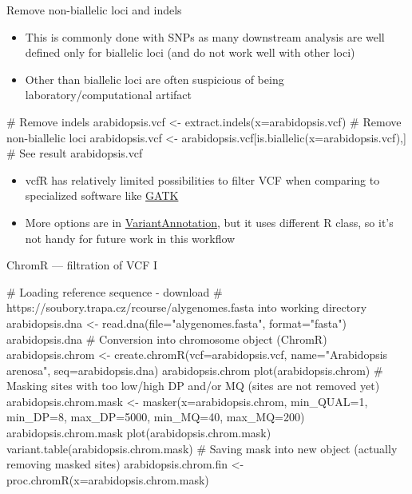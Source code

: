 \documentclass[compress, xelatex, 11pt, xcolor=svgnames, aspectratio=169,
	hyperref={
		bookmarks=true,
		unicode=true,
		colorlinks=true,
		pdftitle={Molecular data in R},
		plainpages=false,
		pdfauthor={Vojtech Zeisek},
		pdfsubject={Course about phylogeny and evolution in R},
		pdfcreator={XeLaTeX},
		pdfkeywords={R, evolution, phylogeny, molecular data},
		linkcolor=Crimson, %
		anchorcolor=Magenta, %
		citecolor=Magenta, %
		filecolor=Magenta, %
		menucolor=Magenta, %
		urlcolor=DodgerBlue, %
		},
	url={hyphens, lowtilde} %
	]{beamer}
\begin{document}
\begin{frame}[fragile]{Remove non-biallelic loci and indels}
	\begin{itemize}
		\item This is commonly done with SNPs as many downstream analysis are well defined only for biallelic loci (and do not work well with other loci)
		\item Other than biallelic loci are often suspicious of being laboratory/computational artifact
	\end{itemize}
	\begin{spluscode}
    # Remove indels
    arabidopsis.vcf <- extract.indels(x=arabidopsis.vcf)
    # Remove non-biallelic loci
    arabidopsis.vcf <- arabidopsis.vcf[is.biallelic(x=arabidopsis.vcf),]
    # See result
    arabidopsis.vcf
	\end{spluscode}
	\begin{itemize}
		\item vcfR has relatively limited possibilities to filter VCF when comparing to specialized software like \href{https://gatk.broadinstitute.org/}{GATK}
		\item More options are in \href{https://bioconductor.org/packages/release/bioc/html/VariantAnnotation.html}{VariantAnnotation}, but it uses different R class, so it's not handy for future work in this workflow
	\end{itemize}
\end{frame}

\begin{frame}[fragile]{ChromR --- filtration of VCF I}
	\begin{spluscode}
    # Loading reference sequence - download
    # https://soubory.trapa.cz/rcourse/alygenomes.fasta into working directory
    arabidopsis.dna <- read.dna(file="alygenomes.fasta", format="fasta")
    arabidopsis.dna
    # Conversion into chromosome object (ChromR)
    arabidopsis.chrom <- create.chromR(vcf=arabidopsis.vcf,
      name="Arabidopsis arenosa", seq=arabidopsis.dna)
    arabidopsis.chrom
    plot(arabidopsis.chrom)
    # Masking sites with too low/high DP and/or MQ (sites are not removed yet)
    arabidopsis.chrom.mask <- masker(x=arabidopsis.chrom, min_QUAL=1,
      min_DP=8, max_DP=5000, min_MQ=40, max_MQ=200)
    arabidopsis.chrom.mask
    plot(arabidopsis.chrom.mask)
    variant.table(arabidopsis.chrom.mask)
    # Saving mask into new object (actually removing masked sites)
    arabidopsis.chrom.fin <- proc.chromR(x=arabidopsis.chrom.mask)
	\end{spluscode}
\end{frame}
\end{document}
